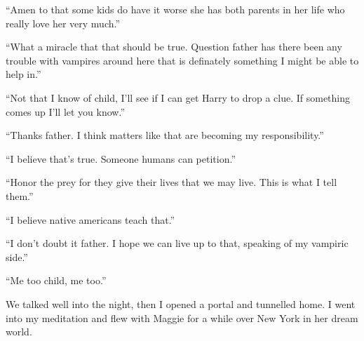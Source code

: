 ``Amen to that some kids do have it worse she has both parents in her life who really love her very much.''

``What a miracle that that should be true. Question father has there been any trouble with vampires around here that is definately something I might be able to help in.''

``Not that I know of child, I'll see if I can get Harry to drop a clue. If something comes up I'll let you know.''

``Thanks father. I think matters like that are becoming my responsibility.''

``I believe that's true. Someone humans can petition.''

``Honor the prey for they give their lives that we may live. This is what I tell them.''

``I believe native americans teach that.''

``I don't doubt it father. I hope we can live up to that, speaking of my vampiric side.''

``Me too child, me too.''

We talked well into the night, then I opened a portal and tunnelled home. I went into my meditation and flew with Maggie for a while over New York in her dream world.













